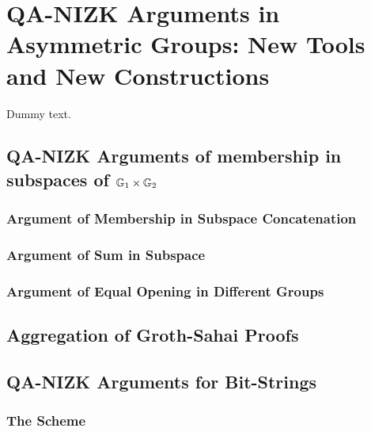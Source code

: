 \chapter{QA-NIZK Arguments in Asymmetric Groups: New Tools and New Constructions}
Dummy text.
    
    \section{QA-NIZK Arguments of membership in subspaces of $\mathbb{G}_1\times\mathbb{G}_2$}\label{sec:agg-asym}
    
        

        \subsection{Argument of Membership in Subspace Concatenation}\label{sec:concat}

        

        \subsection{Argument of Sum in Subspace}\label{sec:sum}
        
        

        \subsection{Argument of Equal Opening in Different Groups} \label{sec:aggcommit}

         

    \section{Aggregation of Groth-Sahai Proofs}\label{sec:agg-gs}

        

    \section{QA-NIZK Arguments for Bit-Strings} \label{sec:bits}
    
        

        \subsection{The Scheme} \label{sec:bits-scheme}

